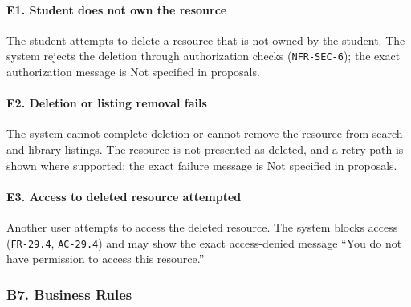 \documentclass[12pt]{article}
\begin{document}
\paragraph*{E1. Student does not own the resource}
\par\medskip

The student attempts to delete a resource that is not owned by the student. The system rejects the deletion through authorization checks (\texttt{NFR-SEC-6}); the exact authorization message is Not specified in proposals.
\par\medskip

\hypertarget{sec:e2-deletion-or-listing-removal-fails}{}
\paragraph*{E2. Deletion or listing removal fails}
\par\medskip

The system cannot complete deletion or cannot remove the resource from search and library listings. The resource is not presented as deleted, and a retry path is shown where supported; the exact failure message is Not specified in proposals.
\par\medskip

\hypertarget{sec:e3-access-to-deleted-resource-attempted}{}
\paragraph*{E3. Access to deleted resource attempted}
\par\medskip

Another user attempts to access the deleted resource. The system blocks access (\texttt{FR-29.4}, \texttt{AC-29.4}) and may show the exact access-denied message “You do not have permission to access this resource.”
\par\medskip

\hypertarget{sec:b7-business-rules}{}
\subsubsection*{B7. Business Rules}
\par\medskip
\end{document}
